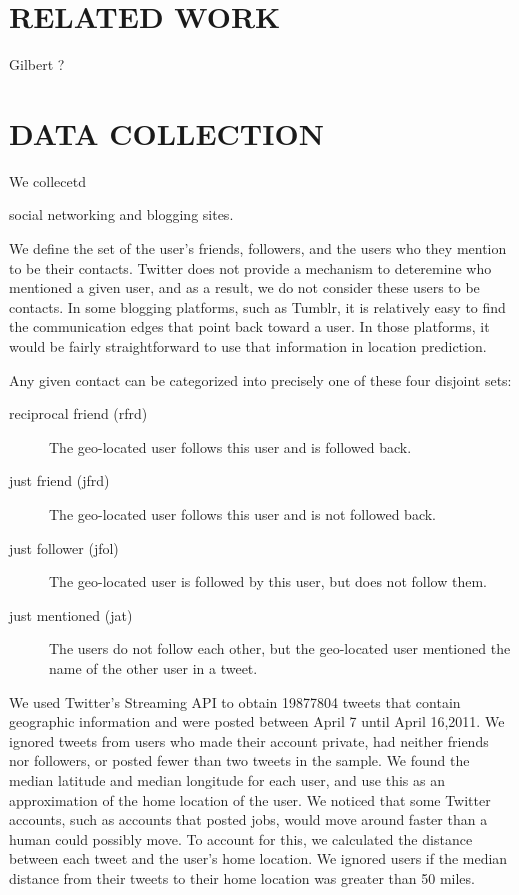 \documentclass{sig-alternate}
\begin{document}
\section{RELATED WORK}
\cite{scellato2011socio}
\cite{scellato2010distance}
\cite{backstrom2010find}
\cite{cheng2010you}
Gilbert ?


\section{DATA COLLECTION}
We collecetd 

social networking and blogging sites.

We define the set of the user's friends, followers, and the users who they mention to be their contacts.
Twitter does not provide a mechanism to deteremine who mentioned a given user, and as a result, we do not consider these users to be contacts.
In some blogging platforms, such as Tumblr, it is relatively easy to find the communication edges that point back toward a user.
In those platforms, it would be fairly straightforward to use that information in location prediction.

Any given contact can be categorized into precisely one of these four disjoint sets:
\begin{description}
\item[reciprocal friend (rfrd)] The geo-located user follows this user and is followed back.
\item[just friend (jfrd)] The geo-located user follows this user and is not followed back.
\item[just follower (jfol)]The geo-located user is followed by this user, but does not follow them.
\item[just mentioned (jat)] The users do not follow each other, but the geo-located user mentioned the name of the other user in a tweet.
\end{description}

We used Twitter's Streaming API to obtain 19877804 tweets that contain
geographic information and were posted between April 7 until April 16,2011.
We ignored tweets from users who made their account private, had neither
friends nor followers, or posted fewer than two tweets in the sample.
We found the median latitude and median longitude for each user, and use this
as an approximation of the home location of the user.
We noticed that some Twitter accounts, such as accounts that posted jobs, would
move around faster than a human could possibly move. To account for this, we
calculated the distance between each tweet and the user's home location. We
ignored users if the median distance from their tweets to their home location
was greater than 50 miles.
\end{document}
